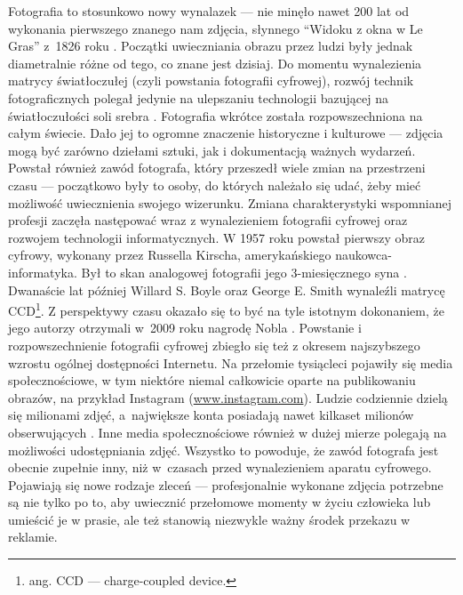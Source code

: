 \documentclass[a4paper, 12pt]{article}
\numberwithin{figure}{section}
\begin{document}
\begin{sloppypar}
Fotografia to stosunkowo nowy wynalazek --- nie minęło nawet 200 lat od wykonania pierwszego znanego nam zdjęcia, słynnego ``Widoku z okna w Le Gras'' z~1826 roku \cite{fotografia}. Początki uwieczniania obrazu przez ludzi były jednak diametralnie różne od tego, co znane jest dzisiaj. Do momentu wynalezienia matrycy światłoczułej (czyli powstania fotografii cyfrowej), rozwój technik fotograficznych polegał jedynie na ulepszaniu technologii bazującej na światłoczułości soli srebra \cite{fotografia}. Fotografia wkrótce została rozpowszechniona na całym świecie. Dało jej to ogromne znaczenie historyczne i kulturowe --- zdjęcia mogą być zarówno dziełami sztuki, jak i dokumentacją ważnych wydarzeń. Powstał również zawód fotografa, który przeszedł wiele zmian na przestrzeni czasu --- początkowo były to osoby, do których należało się udać, żeby mieć możliwość uwiecznienia swojego wizerunku. Zmiana charakterystyki wspomnianej profesji zaczęła następować wraz z wynalezieniem fotografii cyfrowej oraz rozwojem technologii informatycznych. W 1957 roku powstał pierwszy obraz cyfrowy, wykonany przez Russella Kirscha, amerykańskiego naukowca-informatyka. Był to skan analogowej fotografii jego 3-miesięcznego syna \cite{firstdigitalphoto}. Dwanaście lat później Willard S. Boyle oraz George E. Smith wynaleźli matrycę CCD\footnote{ang. CCD --- charge-coupled device.}. Z perspektywy czasu okazało się to być na tyle istotnym dokonaniem, że jego autorzy otrzymali w~2009 roku nagrodę Nobla \cite{nobelfoto}. Powstanie i rozpowszechnienie fotografii cyfrowej zbiegło się też z okresem najszybszego wzrostu ogólnej dostępności Internetu. Na przełomie tysiącleci pojawiły się media społecznościowe, w tym niektóre niemal całkowicie oparte na publikowaniu obrazów, na przykład Instagram (\url{www.instagram.com}). Ludzie codziennie dzielą się milionami zdjęć, a~największe konta posiadają nawet kilkaset milionów obserwujących \cite{instagram}. Inne media społecznościowe również w dużej mierze polegają na możliwości udostępniania zdjęć. Wszystko to powoduje, że zawód fotografa jest obecnie zupełnie inny, niż w~czasach przed wynalezieniem aparatu cyfrowego. Pojawiają się nowe rodzaje zleceń --- profesjonalnie wykonane zdjęcia potrzebne są nie tylko po to, aby uwiecznić przełomowe momenty w życiu człowieka lub umieścić je w prasie, ale też stanowią niezwykle ważny środek przekazu w reklamie. 


\end{sloppypar}
\end{document}
